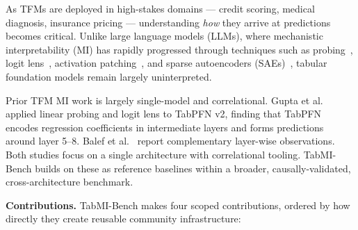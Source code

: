 \documentclass{article}
\begin{document}
As TFMs are deployed in high-stakes domains --- credit scoring, medical diagnosis, insurance pricing --- understanding \textit{how} they arrive at predictions becomes critical. Unlike large language models (LLMs), where mechanistic interpretability (MI) has rapidly progressed through techniques such as probing~\cite{alain2016understanding}, logit lens~\cite{nostalgebraist2020logitlens}, activation patching~\cite{heimersheim2024activation}, and sparse autoencoders (SAEs)~\cite{bricken2023towards}, tabular foundation models remain largely uninterpreted.

Prior TFM MI work is largely single-model and correlational. Gupta et al.~\cite{gupta2026tabpfn} applied linear probing and logit lens to TabPFN v2, finding that TabPFN encodes regression coefficients in intermediate layers and forms predictions around layer 5--8. Balef et al.~\cite{balef2025layers} report complementary layer-wise observations. Both studies focus on a single architecture with correlational tooling. TabMI-Bench builds on these as reference baselines within a broader, causally-validated, cross-architecture benchmark.

\textbf{Contributions.} TabMI-Bench makes four scoped contributions, ordered by how directly they create reusable community infrastructure:
\end{document}
